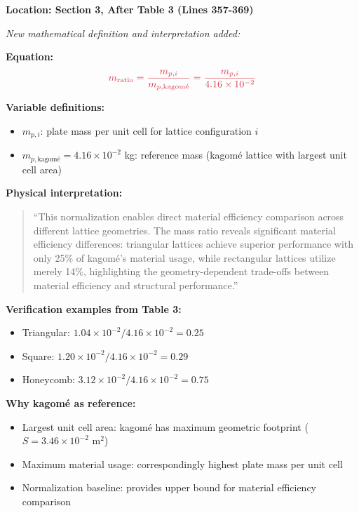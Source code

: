 \documentclass[11pt,a4paper]{article}
\newenvironment{changesbox}{%
    \par\medskip\noindent{\color{changescolor}\rule{\linewidth}{2pt}}\par
    \noindent{\color{changescolor}\bfseries Manuscript Changes}\par\smallskip
}{%
    \par\noindent{\color{changescolor}\rule{\linewidth}{0.5pt}}\medskip
}
\begin{document}
\begin{changesbox}
\textbf{Location: Section 3, After Table 3 (Lines 357-369)}

\textit{New mathematical definition and interpretation added:}

\textbf{Equation:}
\begin{equation}
\textcolor{redtext}{m_{\text{ratio}} = \frac{m_{p,i}}{m_{p,\text{kagom\'{e}}}} = \frac{m_{p,i}}{4.16 \times 10^{-2}}}
\end{equation}

\textbf{Variable definitions:}
\begin{itemize}
    \item $m_{p,i}$: plate mass per unit cell for lattice configuration $i$
    \item $m_{p,\text{kagom\'{e}}} = 4.16 \times 10^{-2}$ kg: reference mass (kagom\'{e} lattice with largest unit cell area)
\end{itemize}

\textbf{Physical interpretation:}
\begin{quote}
\textcolor{redtext}{``This normalization enables direct material efficiency comparison across different lattice geometries. The mass ratio reveals significant material efficiency differences: triangular lattices achieve superior performance with only 25\% of kagom\'{e}'s material usage, while rectangular lattices utilize merely 14\%, highlighting the geometry-dependent trade-offs between material efficiency and structural performance.''}
\end{quote}

\textbf{Verification examples from Table 3:}
\begin{itemize}
    \item Triangular: $1.04 \times 10^{-2} / 4.16 \times 10^{-2} = 0.25$ \checkmark
    \item Square: $1.20 \times 10^{-2} / 4.16 \times 10^{-2} = 0.29$ \checkmark
    \item Honeycomb: $3.12 \times 10^{-2} / 4.16 \times 10^{-2} = 0.75$ \checkmark
\end{itemize}

\textbf{Why kagom\'{e} as reference:}
\begin{itemize}
    \item Largest unit cell area: kagom\'{e} has maximum geometric footprint ($S = 3.46 \times 10^{-2}$ m$^2$)
    \item Maximum material usage: correspondingly highest plate mass per unit cell
    \item Normalization baseline: provides upper bound for material efficiency comparison
\end{itemize}
\end{changesbox}
\end{document}
